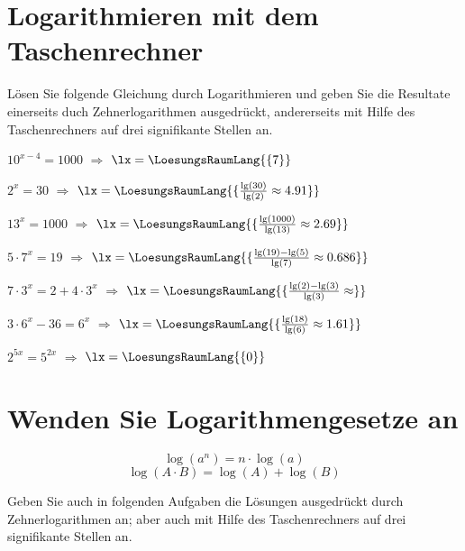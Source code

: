 \platzFuerBerechnungenBisEndeSeite{}

\section{Logarithmieren mit dem Taschenrechner}
Lösen Sie folgende Gleichung durch Logarithmieren und geben Sie die
Resultate einerseits duch Zehnerlogarithmen ausgedrückt, andererseits mit
Hilfe des Taschenrechners auf drei signifikante Stellen an.

\begin{bbwAufgabenBlock}
\item $10^{x-4}=1000$ $\Longrightarrow$ $\lx=\LoesungsRaumLang{\{7\}}$ \plz{}
\item $2^x=30$ $\Longrightarrow$ $\lx=\LoesungsRaumLang{\{\frac{\lg(30)}{\lg(2)}\approx 4.91}\}$ \plz{}
\item $13^x=1000$ $\Longrightarrow$ $\lx=\LoesungsRaumLang{\{\frac{\lg(1000)}{\lg(13)}\approx 2.69\}}$ \plz{}\noTRAINER{\newpage}
\item $5\cdot{}7^x = 19$ $\Longrightarrow$ $\lx=\LoesungsRaumLang{\{\frac{\lg(19)-\lg(5)}{\lg(7)}\approx 0.686\}}$ \plz{}
\item $7\cdot{}3^x = 2 + 4\cdot{}3^x$ $\Longrightarrow$ $\lx=\LoesungsRaumLang{\{\frac{\lg(2)-\lg(3)}{\lg(3)}\approx  \}}$ \plz{}
\item $3\cdot{}6^x - 36 = 6^x$ $\Longrightarrow$ $\lx=\LoesungsRaumLang{\{\frac{\lg(18)}{\lg(6)} \approx  1.61 \}}$ \plz{}\noTRAINER{\newpage}
\item $2^{5x} = 5^{2x}$ $\Longrightarrow$ $\lx=\LoesungsRaumLang{\{0\}}$ \plz{}
\end{bbwAufgabenBlock}

\platzFuerBerechnungenBisEndeSeite{}

\section{Wenden Sie Logarithmengesetze an}

$$\log(a^n) = n\cdot{}\log(a)$$
$$\log(A\cdot{}B) = \log(A) + \log(B)$$

Geben Sie auch in folgenden Aufgaben die Lösungen ausgedrückt durch
Zehnerlogarithmen an; aber auch mit Hilfe des Taschenrechners auf drei
signifikante Stellen an.

